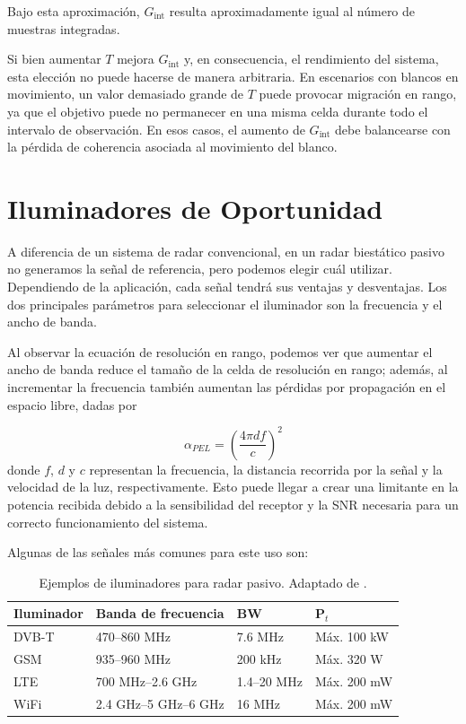 	Bajo esta aproximación, \(G_{\mathrm{int}}\) resulta aproximadamente igual al número de muestras integradas.

	Si bien aumentar \(T\) mejora \(G_{\mathrm{int}}\) y, en consecuencia, el rendimiento del sistema, esta elección no puede hacerse de manera arbitraria. En escenarios con blancos en movimiento, un valor demasiado grande de \(T\) puede provocar migración en rango, ya que el objetivo puede no permanecer en una misma celda durante todo el intervalo de observación. En esos casos, el aumento de \(G_{\mathrm{int}}\) debe balancearse con la pérdida de coherencia asociada al movimiento del blanco.

	\section{Iluminadores de Oportunidad}

	A diferencia de un sistema de radar convencional, en un radar biestático pasivo no generamos la señal de referencia, pero podemos elegir cuál utilizar. Dependiendo de la aplicación, cada señal tendrá sus ventajas y desventajas. Los dos principales parámetros para seleccionar el iluminador son la frecuencia y el ancho de banda.

	Al observar la ecuación de resolución en rango, podemos ver que aumentar el ancho de banda reduce el tamaño de la celda de resolución en rango; además, al incrementar la frecuencia también aumentan las pérdidas por propagación en el espacio libre, dadas por

	\begin{equation}
		\label{eq:pel}
		\alpha_{PEL} = \left(\frac{4 \pi d f}{c}\right)^2
	\end{equation}
	donde \(f\), \(d\) y \(c\) representan la frecuencia, la distancia recorrida por la señal y la velocidad de la luz, respectivamente. Esto puede llegar a crear una limitante en la potencia recibida debido a la sensibilidad del receptor y la SNR necesaria para un correcto funcionamiento del sistema.

	Algunas de las señales más comunes para este uso son:

{	\begin{table}[H]
		\renewcommand{\arraystretch}{1.4}
		\caption[Ejemplos de iluminadores para radar pasivo.]{Ejemplos de iluminadores para radar pasivo. Adaptado de \cite{malanowski}.}
		\begin{tabular}{|l | l |l | l|}
			\hline
			Iluminador & Banda de frecuencia & BW & P$_{t}$ \\
			\hline
			DVB-T & 470--860 MHz & 7.6 MHz & Máx. 100 kW \\\hline
			GSM & 935--960 MHz & 200 kHz & Máx. 320 W \\\hline
			LTE & 700 MHz--2.6 GHz & 1.4--20 MHz & Máx. 200 mW \\\hline
			WiFi & 2.4 GHz--5 GHz--6 GHz & 16 MHz & Máx. 200 mW \\
			\hline
		\end{tabular}
		\centering

		\label{tab:iluminadores}
	\end{table}}

